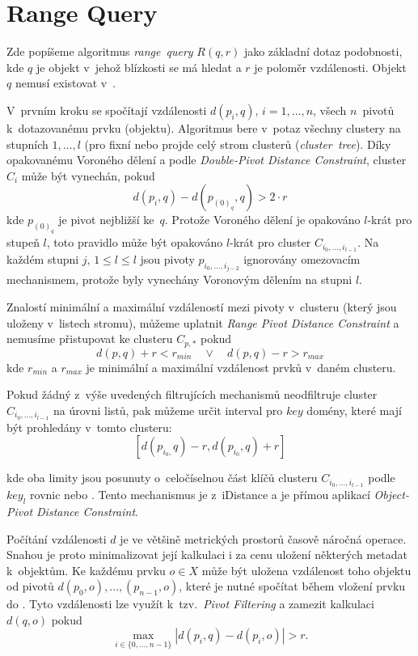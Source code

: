 \section{Range Query\label{sec:Range-Query}}

Zde popíšeme algoritmus \emph{range~query} $R(q,r)$ jako základní dotaz podobnosti, kde $q$ je objekt v~jehož blízkosti se má hledat a $r$ je poloměr vzdálenosti. Objekt $q$ nemusí existovat v~. 


V~prvním kroku se spočítají vzdálenosti $d(p_{i},q),\, i=1,\ldots,n$,
všech $n$~pivotů k~dotazovanému prvku (objektu)\@. Algoritmus
bere v~potaz všechny clustery na stupních $1,\ldots,l$ (pro fixní
\MIndex{} nebo projde celý strom clusterů (\emph{cluster~tree})\@.
Díky opakovanému Voroného dělení a podle \emph{Double-Pivot Distance
Constraint}\cite{similaritysearch2006}, cluster $C_{i}$ může být
vynechán, pokud
\[
d(p_{i},q)-d(p_{(0)_{q}},q)>2\cdot r
\]
kde $p_{(0)_{q}}$ je pivot nejbližší ke~$q$\@. Protože Voroného
dělení je opakováno $l$-krát pro stupeň $l$, toto pravidlo může
být opakováno $l$-krát pro cluster $C_{i_{0},\ldots,i_{l-1}}$\@.
Na každém stupni $j,\,1\leq l\leq l$ jsou pivoty $p_{i_{0},\ldots,i_{j-2}}$
ignorovány omezovacím mechanismem, protože byly vynechány Voronovým
dělením na stupni $l$\@.

Znalostí minimální a maximální vzdáleností mezi pivoty v~clusteru
(který jsou uloženy v~listech stromu), můžeme uplatnit \emph{Range Pivot
Distance Constraint}\cite{similaritysearch2006} a nemusíme přistupovat
ke clusteru $C_{p,*}$ pokud
\[
d(p,q)+r<r_{min} \quad \vee \quad d(p,q)-r>r_{max}
\]
kde $r_{min}$ a $r_{max}$ je minimální a maximální vzdálenost prvků
v~daném clusteru\@.

Pokud žádný z~výše uvedených filtrujících mechanismů neodfiltruje
cluster $C_{i_{0},\ldots,i_{l-1}}$ na úrovni listů, pak můžeme určit
interval pro $key$ domény, které mají být prohledány v~tomto clusteru:
\[
[d(p_{i_{0},}q)-r,d(p_{i_{0}},q)+r]
\]

kde oba limity jsou posunuty o~celočíselnou část klíčů clusteru $C_{i_{0},\ldots,i_{l-1}}$ podle
$key_{l}$ rovnic  nebo .
Tento mechanismus je  \linebreak z~iDistance a je přímou aplikací
\emph{Object-Pivot Distance Constraint}\cite{similaritysearch2006}.

Počítání vzdálenosti $d$ je ve většině metrických prostorů časově náročná operace.
Snahou je proto minimalizovat její kalkulaci i za cenu uložení některých metadat k~objektům.
Ke každému prvku  $o\in X$ může být uložena vzdálenost toho objektu od pivotů $d(p_0,o),\ldots,(p_{n-1},o)$, které je nutné  spočítat během vložení prvku do .
Tyto vzdálenosti lze využít k~tzv.~\emph{Pivot Filtering}\cite{similaritysearch2006} a zamezit kalkulaci $d(q,o)$ pokud
\[
\max_{i \in \{0,\ldots,n-1\}} |d(p_i,q)-d(p_i,o)| > r.
\]


